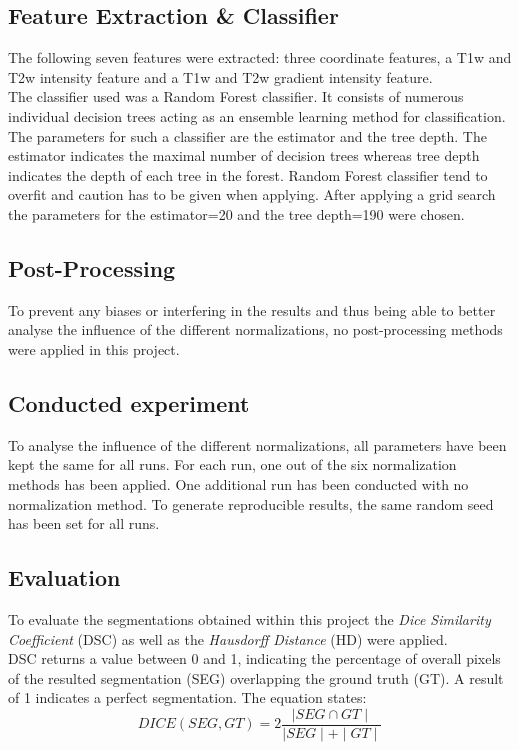 \documentclass[article]{IEEEtran}
\begin{document}
\subsection{Feature Extraction \& Classifier} 
	The following seven features were extracted: three coordinate features, a T1w and T2w intensity feature and a T1w and T2w gradient intensity feature.\\
	The classifier used was a Random Forest classifier. It consists of numerous individual decision trees acting as an ensemble learning method for classification.
	The parameters for such a classifier are the estimator and the tree depth. The estimator indicates the maximal number of decision trees whereas tree depth indicates the depth of each tree in the forest.
	Random Forest classifier tend to overfit and caution has to be given when applying.
	After applying a grid search the parameters for the estimator=20 and the tree depth=190 were chosen. 
	
	
\subsection{Post-Processing} 
	To prevent any biases or interfering in the results and thus being able to better analyse the influence of the different normalizations, no post-processing methods were applied in this project. 
	
	
\subsection{Conducted experiment}
	To analyse the influence of the different normalizations, all parameters have been kept the same for all runs. 
	For each run, one out of the six normalization methods has been applied. One additional run has been conducted with no normalization method.
	To generate reproducible results, the same random seed has been set for all runs.  
	
\subsection{Evaluation}
	To evaluate the segmentations obtained within this project the {\itshape Dice Similarity Coefficient} (DSC) as well as the {\itshape Hausdorff Distance} (HD) were applied.\\
	DSC returns a value between 0 and 1, indicating the percentage of overall pixels of the resulted segmentation (SEG) overlapping the ground truth (GT). 
	A result of 1 indicates a perfect segmentation. The equation states: 
	\begin{equation}
		DICE(SEG, GT) = 2 \frac{\mid SEG \cap GT \mid}{\mid SEG \mid + \mid GT \mid}
	\end{equation}
\end{document}
